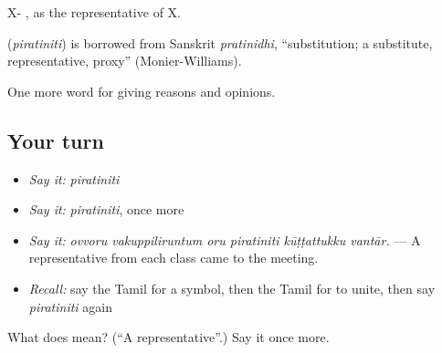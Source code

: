 X- , as the representative of X.

\begin{cousinweb}
\textbf{} (\emph{piratiniti}) is borrowed from Sanskrit \emph{pratinidhi}, \textquotedblleft{}substitution; a substitute, representative, proxy\textquotedblright{} (Monier-Williams).
\end{cousinweb}

\begin{grammarlens}[title={What you've built}]
One more word for giving reasons and opinions.
\end{grammarlens}

\subsection*{Your turn}
\begin{itemize}
\raggedright
  \item \emph{Say it:} \emph{piratiniti}
  \item \emph{Say it:} \emph{piratiniti}, once more
  \item \emph{Say it:} \emph{ovvoru vakuppiliruntum oru piratiniti kūṭṭattukku vantār.} — A representative from each class came to the meeting.
  \item \emph{Recall:} say the Tamil for a symbol, then the Tamil for to unite, then say \emph{piratiniti} again
\end{itemize}

\begin{tcolorbox}[breakable,colback=teal!4,colframe=teal!35!black,title={Before you move on}]
What does  mean? (\textquotedblleft{}A representative\textquotedblright{}.) Say it once more.
\end{tcolorbox}
